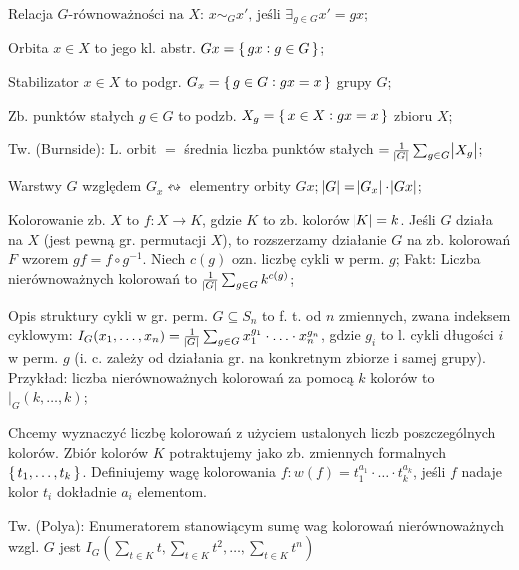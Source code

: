Relacja $G\text{-równoważności na } X$:
  $x \sim_G x' \text{, jeśli } \exists_{g\in G} x' = gx$;

Orbita $x \in X$ to jego kl. abstr. $Gx=\set{gx:g\in G}$;

Stabilizator $x \in X$ to podgr. $G_x = \set{g\in G: gx = x}$ grupy $G$;

Zb. punktów stałych $g \in G$ to podzb. $X_g = \set{x\in X: gx=x}$ zbioru $X$;

Tw. (Burnside): L. orbit $=$ średnia liczba punktów stałych
  $=\frac{1}{\abs{G}}\sum_{g\in G}\abs{X_g}$;

Warstwy $G$ względem $G_x \leftrightsquigarrow$ elementry orbity $Gx$;
$\abs{G} = \abs{G_x} \cdot \abs{Gx}$;

Kolorowanie zb. $X$ to $f: X\rightarrow K$, gdzie $K$ to zb. kolorów
  $\abs{K} = k$. Jeśli $G$ działa na $X$ (jest pewną gr. permutacji $X$), to
  rozszerzamy działanie $G$ na zb. kolorowań $F$ wzorem $gf=f\circ g^{-1}$.
  Niech $c(g)$ ozn. liczbę cykli w perm. $g$; Fakt: Liczba nierównoważnych
  kolorowań to $\frac{1}{\abs{G}}\sum_{g\in G}k^{c(g)}$;

Opis struktury cykli w gr. perm. $G \subseteq S_n$ to f. t. od $n$ zmiennych,
  zwana indeksem cyklowym: $I_G(x_1,\ldots,x_n)=
  \frac{1}{\abs{G}}\sum_{g\in G}x_1^{g_1}\cdot\ldots\cdot x_n^{g_n}$, gdzie
  $g_i$ to l. cykli długości $i$ w perm. $g$ (i. c. zależy od działania gr.
  na konkretnym zbiorze i samej grupy). Przykład: liczba nierównoważnych
  kolorowań za pomocą $k$ kolorów to $|_G(k,\ldots,k)$;

Chcemy wyznaczyć liczbę kolorowań z użyciem ustalonych liczb
  poszczególnych kolorów. Zbiór kolorów $K$ potraktujemy jako zb. zmiennych
  formalnych $\set{t_1,\ldots,t_k}$. Definiujemy wagę kolorowania
  $f: w(f) = t_1^{a_1}\cdot\ldots\cdot t_k^{a_k}$, jeśli $f$ nadaje kolor $t_i$
  dokładnie $a_i$ elementom.

Tw. (Polya): Enumeratorem stanowiącym sumę wag kolorowań nierównoważnych wzgl.
  $G$ jest $I_G(\sum_{t\in K}t, \sum_{t\in K}t^2, \ldots, \sum_{t\in K}t^n)$

